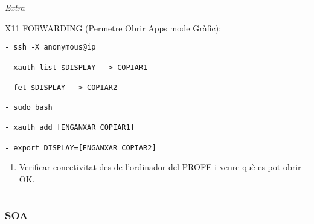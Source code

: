 \documentclass[]{article}
\providecommand{\tightlist}{%
  \setlength{\itemsep}{0pt}\setlength{\parskip}{0pt}}
\begin{document}
\emph{Extra}

X11 FORWARDING (Permetre Obrir Apps mode Gràfic):

\begin{verbatim}
- ssh -X anonymous@ip

- xauth list $DISPLAY --> COPIAR1

- fet $DISPLAY --> COPIAR2

- sudo bash

- xauth add [ENGANXAR COPIAR1]

- export DISPLAY=[ENGANXAR COPIAR2]
\end{verbatim}

\begin{enumerate}
\def\labelenumi{\arabic{enumi}.}
\setcounter{enumi}{4}
\tightlist
\item
  Verificar conectivitat des de l'ordinador del PROFE i veure què es pot
  obrir OK.
\end{enumerate}

\begin{center}\rule{0.5\linewidth}{0.5pt}\end{center}

\hypertarget{soa}{%
\subsubsection{\texorpdfstring{\textbf{SOA}}{SOA}}\label{soa}}
\end{document}
